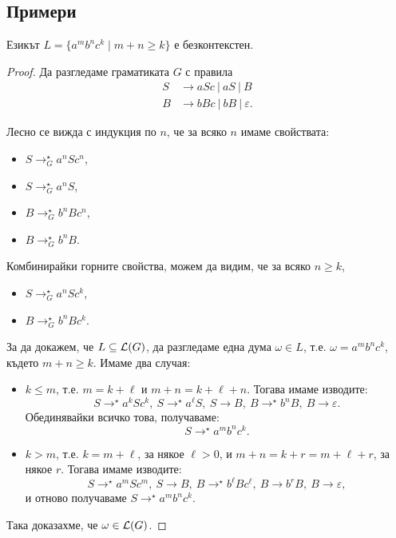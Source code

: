 \subsection{Примери}


\begin{example}
  Езикът $L = \{a^mb^nc^k\mid m+n \geq k\}$ е безконтекстен.
\end{example}  
\begin{proof}
  Да разгледаме граматиката $G$ с правила
  \begin{align*}
    S& \rightarrow aSc\ |\ aS\ |\ B\\
    B& \rightarrow bBc\ |\  bB\ |\ \varepsilon.
  \end{align*}
  
  Лесно се вижда с индукция по $n$, че за всяко $n$ имаме свойствата:
  \begin{itemize}
  \item 
    $S \rightarrow^\star_G a^nSc^n$,
  \item
    $S \rightarrow^\star_G a^nS$,
  \item
    $B \rightarrow^\star_G b^nBc^n$,
  \item
    $B \rightarrow^\star_G b^nB$.
  \end{itemize}
  Комбинирайки горните свойства, можем да видим, че за всяко $n \geq k$,
  \begin{itemize}
  \item 
    $S \rightarrow^\star_G a^nSc^k$,
  \item
    $B \rightarrow^\star_G b^nBc^k$.
  \end{itemize}
  За да докажем, че $L \subseteq \mathcal{L}(G)$, 
  да разгледаме една дума $\omega \in L$, т.е. $\omega = a^mb^nc^k$, където $m+n \geq k$.
  Имаме два случая:
  \begin{itemize}
  \item 
    $k \leq m$, т.е. $m = k+\ell$ и $m+n = k+\ell+n$.
    Тогава имаме изводите:
    \[S \rightarrow^\star a^kSc^k,\ S \rightarrow^\star a^\ell S,\ S \rightarrow B,\ B \rightarrow^\star b^nB,\ B \rightarrow \varepsilon.\]
    Обединявайки всичко това, получаваме:
    \[S \rightarrow^\star a^mb^nc^k.\]
  \item
    $k > m$, т.е. $k = m+\ell$, за някое $\ell > 0$, и $m+n = k+r = m+\ell+r$, за някое $r$.
    Тогава имаме изводите:
    \[S \rightarrow^\star a^mSc^m,\ S\rightarrow B,\ B\rightarrow^\star b^\ell Bc^\ell,\ B\rightarrow b^rB,\ B\rightarrow\varepsilon,\]
    и отново получаваме $S \rightarrow^\star a^mb^nc^k$.
  \end{itemize}
  Така доказахме, че $\omega \in \mathcal{L}(G)$.
  

\end{proof}
